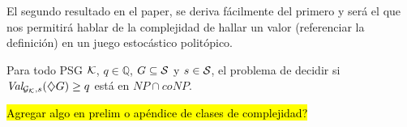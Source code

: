 El segundo resultado en el paper, se deriva fácilmente del primero y será el
que nos permitirá hablar de la complejidad de hallar un valor (referenciar la
definición) en un juego estocástico politópico.

\begin{theorem}
	Para todo PSG $\mathcal{K}$, $q \in \mathbb{Q}$, $G \subseteq \mathcal{S}$ y $s \in \mathcal{S}$, el problema de decidir si $\textit{Val}_{\mathcal{G}_{\mathcal{K}}, s}(\diamondsuit G) \geq q$ está en $NP \cap coNP$.
\end{theorem}

\hl{Agregar algo en prelim o apéndice de clases de complejidad?}




